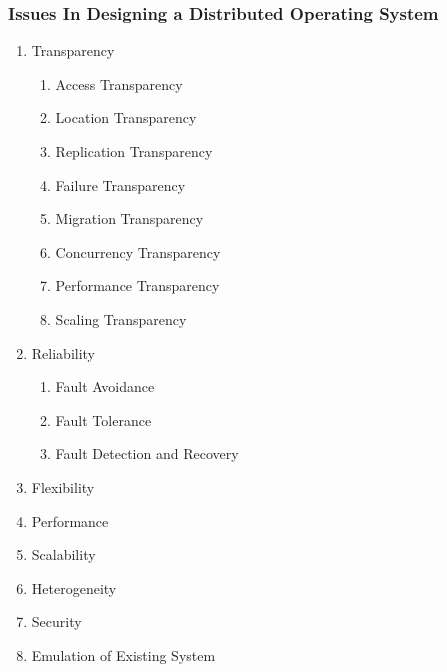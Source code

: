 \begin{frame}
    \frametitle{Issues In Designing a Distributed Operating System}
    \begin{enumerate}
      	\item {Transparency
      	\begin{enumerate}
      		\item Access Transparency
        	\item Location Transparency
        	\item Replication Transparency
        	\item Failure Transparency
        	\item Migration Transparency
        	\item Concurrency Transparency
        	\item Performance Transparency
        	\item Scaling Transparency
      	\end{enumerate}}
      	\item {Reliability
      		\begin{enumerate}
      			\item Fault Avoidance
      			\item Fault Tolerance
      			\item Fault Detection and Recovery
      		\end{enumerate}}
      	\item Flexibility
      	\item Performance
      	\item Scalability
      	\item Heterogeneity
      	\item Security
      	\item Emulation of Existing System
    \end{enumerate}   
\end{frame}   